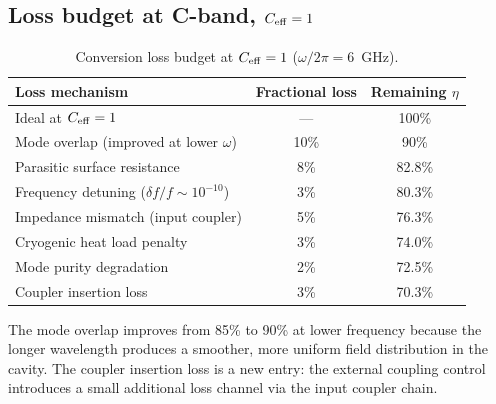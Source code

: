 \documentclass[11pt]{article}
\begin{document}
\subsection{Loss budget at C-band, $C_{\rm eff} = 1$}

\begin{table}[H]
\centering
\caption{Conversion loss budget at $C_{\rm eff} = 1$ ($\omega/2\pi = 6$~GHz).}
\label{tab:loss-budget-Cband}
\begin{tabular}{@{}lcc@{}}
\toprule
Loss mechanism & Fractional loss & Remaining $\eta$ \\
\midrule
Ideal at $C_{\rm eff} = 1$ & --- & 100\% \\
Mode overlap (improved at lower $\omega$) & 10\% & 90\% \\
Parasitic surface resistance & 8\% & 82.8\% \\
Frequency detuning ($\delta f/f \sim 10^{-10}$) & 3\% & 80.3\% \\
Impedance mismatch (input coupler) & 5\% & 76.3\% \\
Cryogenic heat load penalty & 3\% & 74.0\% \\
Mode purity degradation & 2\% & 72.5\% \\
Coupler insertion loss & 3\% & 70.3\% \\
\bottomrule
\end{tabular}
\end{table}

The mode overlap improves from 85\% to 90\% at lower frequency because the
longer wavelength produces a smoother, more uniform field distribution in the
cavity. The coupler insertion loss is a new entry: the external coupling
control introduces a small additional loss channel via the input coupler
chain.
\end{document}
